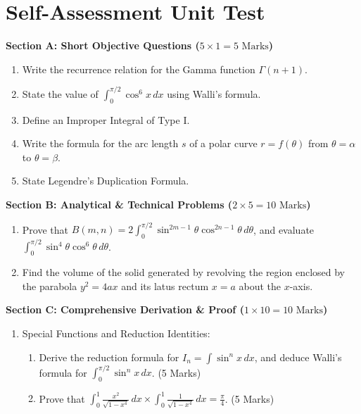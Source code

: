\section{Self-Assessment Unit Test}

\begin{chaptertest}
\noindent\textbf{Section A: Short Objective Questions ($5 \times 1 = 5\text{ Marks}$)}
\begin{enumerate}[leftmargin=1.5em]
    \item Write the recurrence relation for the Gamma function $\Gamma(n+1)$.
    \item State the value of $\int_0^{\pi/2} \cos^6 x\,dx$ using Walli's formula.
    \item Define an Improper Integral of Type I.
    \item Write the formula for the arc length $s$ of a polar curve $r = f(\theta)$ from $\theta = \alpha$ to $\theta = \beta$.
    \item State Legendre's Duplication Formula.
\end{enumerate}

\medskip
\noindent\textbf{Section B: Analytical \& Technical Problems ($2 \times 5 = 10\text{ Marks}$)}
\begin{enumerate}[leftmargin=1.5em, start=6]
    \item Prove that $B(m,n) = 2 \int_0^{\pi/2} \sin^{2m-1}\theta \cos^{2n-1}\theta\,d\theta$, and evaluate $\int_0^{\pi/2} \sin^4\theta \cos^6\theta\,d\theta$.
    \item Find the volume of the solid generated by revolving the region enclosed by the parabola $y^2 = 4ax$ and its latus rectum $x = a$ about the $x$-axis.
\end{enumerate}

\medskip
\noindent\textbf{Section C: Comprehensive Derivation \& Proof ($1 \times 10 = 10\text{ Marks}$)}
\begin{enumerate}[leftmargin=1.5em, start=8]
    \item Special Functions and Reduction Identities:
    \begin{enumerate}[label=(\alph*)]
        \item Derive the reduction formula for $I_n = \int \sin^n x\,dx$, and deduce Walli's formula for $\int_0^{\pi/2} \sin^n x\,dx$. (5 Marks)
        \item Prove that $\int_0^1 \frac{x^2}{\sqrt{1-x^4}}\,dx \times \int_0^1 \frac{1}{\sqrt{1-x^4}}\,dx = \frac{\pi}{4}$. (5 Marks)
    \end{enumerate}
\end{enumerate}
\end{chaptertest}

